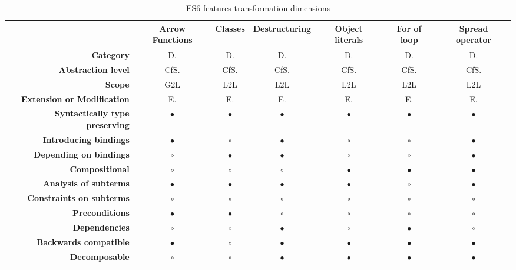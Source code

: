 \begin{landscape}		
\centering

\begin{table}[h]
\caption{ES6 features transformation dimensions}
\label{full-table}
\begin{tabular}{rcccccc}
\hline
& {\bf Arrow Functions} & {\bf Classes} & {\bf Destructuring} & {\bf Object literals} & {\bf For of loop} & {\bf Spread operator} \\ \hline
{\bf Category} & D. & D. & D. & D. & D. & D. \\
{\bf Abstraction level} & CfS. & CfS. & CfS. & CfS. & CfS. & CfS. \\
{\bf Scope} & G2L & L2L & L2L & L2L & L2L & L2L \\
{\bf Extension or Modification} & E. & E. & E. & E. & E. & E. \\
{\bf Syntactically type preserving} & $\bullet$ & $\bullet$ & $\bullet$ & $\bullet$ & $\bullet$ & $\bullet$ \\
{\bf Introducing bindings} & $\bullet$ & $\circ$ & $\bullet$ & $\circ$ & $\circ$ & $\bullet$ \\
{\bf Depending on bindings} & $\circ$ & $\bullet$ & $\bullet$ & $\circ$ & $\circ$ & $\bullet$ \\
{\bf Compositional} & $\circ$ & $\circ$ & $\circ$ & $\bullet$ & $\bullet$ & $\bullet$ \\
{\bf Analysis of subterms} & $\bullet$ & $\bullet$ & $\bullet$ & $\bullet$ & $\circ$ & $\bullet$  \\
{\bf Constraints on subterms} & $\circ$ & $\circ$ & $\circ$ & $\circ$ & $\circ$ & $\circ$   \\
{\bf Preconditions} & $\bullet$ & $\bullet$ & $\circ$ & $\circ$ & $\circ$ & $\circ$   \\
{\bf Dependencies}  & $\circ$ & $\circ$ & $\bullet$ & $\circ$ & $\bullet$ & $\circ$   \\
{\bf Backwards compatible} & $\bullet$ & $\circ$ & $\bullet$ & $\bullet$ & $\bullet$ & $\bullet$  \\
{\bf Decomposable} & $\circ$ & $\circ$ & $\bullet$ & $\bullet$ & $\bullet$ & $\bullet$  \\ \hline
\end{tabular}
\vspace*{0.5cm}
\newline


\end{table}
\end{landscape}

